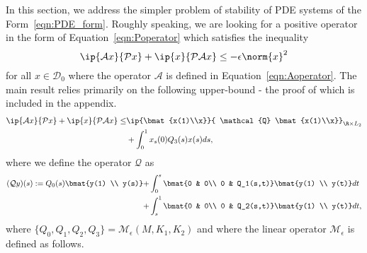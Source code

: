 \documentclass[9pt,journal,twocolumn]{IEEEtran}
\newcommand{\igzo}{\int_0^1}
\begin{document}
In this section, we address the simpler problem of stability of PDE systems of the Form~\eqref{eqn:PDE_form}. Roughly speaking, we are looking for a positive operator in the form of Equation~\eqref{eqn:Poperator} which satisfies the inequality
\[
\ip{\mathcal{A}x}{\mathcal{P}x}+\ip{x}{\mathcal{P}\mathcal{A}x} \le -\epsilon \norm{x}^2
\]
for all $x \in \mathcal{D}_0$ where the operator $\mathcal{A}$ is defined in Equation~\eqref{eqn:Aoperator}. The main result relies primarily on the following upper-bound - the proof of which is included in the appendix.
\begin{align}
  \ip{\mathcal{A}x}{\mathcal{P}x}+\ip{x}{\mathcal{P}\mathcal{A}x} \le &  \ip{\bmat{x(1)\\x}}{ \mathcal{Q} \bmat{x(1)\\x}}_{\R \times L_2} \nonumber \\
  &\label{eqn:stab_LOI}+\igzo x_s(0)Q_3(s)x(s)ds,
 \end{align}
where we define the operator $\mathcal{Q}$ as
\begin{align*}
(\mathcal{Q}y)(s) := Q_0(s)\bmat{y(1) \\ y(s)} +   &\int_0^s  \bmat{0 & 0\\ 0 & Q_1(s,t)}\bmat{y(1) \\ y(t)} dt \\
 + &\int_s^1  \bmat{0 & 0\\ 0 & Q_2(s,t)} \bmat{y(1) \\ y(t)} dt,
\end{align*}
where $\{Q_0,Q_1,Q_2,Q_3\}=\mathcal{M}_\epsilon(M,K_1,K_2)$ and where the linear operator $\mathcal{M}_\epsilon$ is defined as follows.
\end{document}
